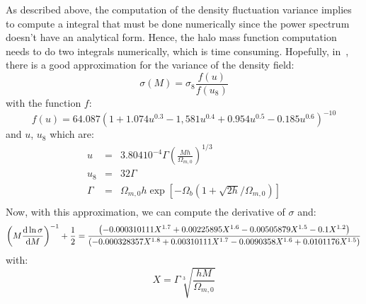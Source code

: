 As described above, the computation of the density fluctuation variance
implies to compute a integral that must be done numerically since the power
spectrum doesn't have an analytical form. Hence, the halo mass function
computation needs to do two integrals numerically, which is time consuming.
Hopefully, in~\cite{vandenBosch+02}, there is a good approximation for the
variance of the density field:
%
\begin{equation}
    \sigma\left(M\right)=\sigma_8\frac{f\left(u\right)}{f\left(u_8\right)}
\end{equation}
%
with the function $f$:
%
\begin{equation}
    f\left(u\right)=
    64.087 {\left(1 + 1.074 u^{0.3} - 1,581 u^{0.4} +
        0.954 u^{0.5} - 0.185 u^{0.6}\right)}^{-10}
\end{equation}
%
and $u$, $u_8$ which are:
%
\begin{eqnarray}
    u & = & 3.804 10^{-4}\Gamma{\left(\frac{Mh}{\Omega_{m,0}}\right)}^{1/3}
        \nonumber\\
    u_8 & = & 32\Gamma\nonumber\\
    \Gamma & = &
        \Omega_{m,0}h\exp
        \left[-\Omega_b\left(1+\sqrt{2h}/\Omega_{m,0}\right)\right]\nonumber\\
\end{eqnarray}
%
Now, with this approximation, we can compute the derivative of
$\sigma$ and:
%
\begin{equation}
    {\left(M\frac{{\rm{d}}\ln\sigma}{{\rm{d}}M}\right)}^{-1}+\frac{1}{2} =
    \frac{\left(-0.000310111 X^{1.7} + 0.00225895 X^{1.6} -
        0.00505879 X^{1.5} - 0.1 X^{1.2}\right)}
        {\left(-0.000328357 X^{1.8} + 0.00310111 X^{1.7} -
        0.0090358 X^{1.6} + 0.0101176 X^{1.5}\right)}
\end{equation}
%
with:
%
\begin{equation}
    X=\Gamma
    \sqrt[3]{\frac{h M}{\Omega _{m,0}}}
\end{equation}
%

